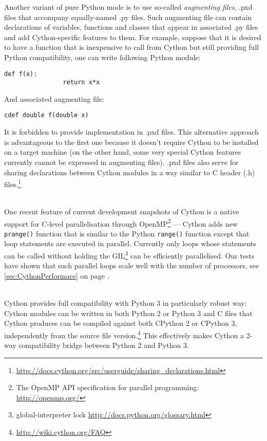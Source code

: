 \begin{description}
		Another variant of pure Python mode is to use so-called \emph{augmenting files}, .pxd files
		that accompany equally-named .py files. Such augmenting file can contain declarations of
		variables, functions and classes that appear in associated .py files and add Cython-specific
		features to them. For example, suppose that it is desired to have a function that is
		inexpensive to call from Cython but still providing full Python compatibility, one can write
		following Python module:
		\vspace{\parskip}
		\begin{Verbatim}[samepage=true,gobble=3,label=module.py,frame=single]
			def f(x):
			    return x*x
		\end{Verbatim}
		And associated augmenting file:
		\vspace{\parskip}
		\begin{Verbatim}[samepage=true,gobble=3,label=module.pxd,frame=single]
			cdef double f(double x)
		\end{Verbatim}
		It is forbidden to provide implementation in .pxd files. This alternative approach is
		advantageous to the first one because it doesn't require Cython to be installed on a target
		machine (on the other hand, some very special Cython features currently cannot be expressed
		in augmenting files). .pxd files also serve for sharing declarations between Cython modules
		in a way similar to C header (.h)
		files.\footnote{\url{http://docs.cython.org/src/userguide/sharing_declarations.html}}
	\item[parallelisation] \hfill \\
		One recent feature of current development snapshots of Cython is a native support for C-level
		parallelisation through OpenMP\footnote{The OpenMP API specification for parallel
		programming: \url{http://openmp.org/}} --- Cython adds new \verb|prange()| function that is
		similar to the Python \verb|range()| function except that loop statements are executed in
		parallel. Currently only loops whose statements can be called without holding the
		GIL\footnote{global-interpreter lock \url{http://docs.python.org/glossary.html}} can be
		efficiently parallelised. Our tests have shown that such parallel loops scale well with the
		number of processors, see \autoref{sec:CythonPerformace} on page \pageref{sec:CythonPerformace}.
	\item[Python 3 compatibility] \hfill \\
		Cython provides full compatibility with Python 3 in particularly robust way: Cython modules
		can be written in both Python 2 or Python 3 and C files that Cython produces can be compiled
		against both CPython 2 or CPython 3, independently from the source file
		version.\footnote{\url{http://wiki.cython.org/FAQ}}
		This effectively makes Cython a 2-way compatibility bridge between Python 2 and Python 3.
\end{description}
